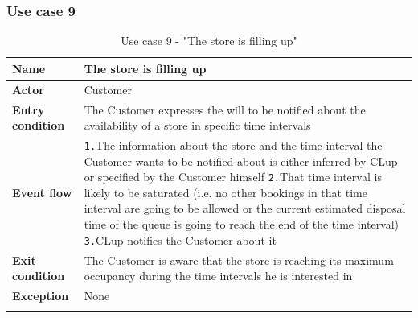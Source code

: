\documentclass[a4paper,oneside,11pt]{book}   %
\begin{document}
    \subsubsection{Use case 9}
    \begin{longtable}[c] { |>{\bfseries{}}C{0.25\textwidth}|V{0.55\textwidth}| }
        \hline
        Name            & The store is filling up \\ \hline
        Actor           & Customer \\ \hline
        Entry condition & The Customer expresses the will to be notified about the availability of a store in specific time intervals \\ \hline
        Event flow      & 
        \texttt{1.}The information about the store and the time interval the Customer wants to be notified about is either inferred by CLup or specified by the Customer himself \newline
        \texttt{2.}That time interval is likely to be saturated (i.e. no other bookings in that time interval are going to be allowed or the current estimated disposal time of the queue is going to reach the end of the time interval) \newline
        \texttt{3.}CLup notifies the Customer about it \\ \hline
        Exit condition  & The Customer is aware that the store is reaching its maximum occupancy during the time intervals he is interested in \\ \hline
        Exception       & None \\
        \hline
    \caption{Use case 9 - "The store is filling up"}
    \label{table:use_case_09}
    \end{longtable}
    
\end{document}
